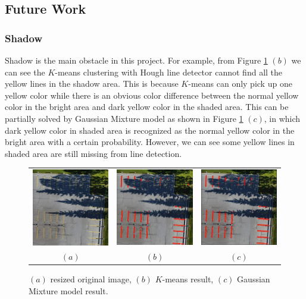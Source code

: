 \documentclass{m2pi}
\begin{document}
\subsection{Future Work}

\subsubsection{Shadow}


Shadow is the main obstacle in this project. For example, from Figure \ref{lot11result} $(b)$ we can see the $K$-means clustering with Hough line detector cannot find all the yellow lines in the shadow area. This is because $K$-means can only pick up one yellow color while there is an obvious color difference between the normal yellow color in the bright area and dark yellow color in the shaded area. This can be partially solved by Gaussian Mixture model as shown in Figure \ref{lot11result} $(c)$, in which dark yellow color in shaded area is recognized as the normal yellow color in the bright area with a certain probability. However, we can see some yellow lines in shaded area are still missing from line detection.

\begin{figure}[htp]
\centering
\begin{tabular}{ccc}
\includegraphics[width=3.8cm]{figures/Resized_Lot11.jpg}&
\includegraphics[width=3.8cm]{figures/Boxed_Lot11.jpg}&
\includegraphics[width=3.8cm]{figures/detected_Lot11.jpg}\\
$(a)$ & $(b)$ & $(c)$
\end{tabular}
\caption{$(a)$ resized original image, $(b)$ $K$-means result,
$(c)$ Gaussian Mixture model result.}
\label{lot11result}
\end{figure}
\end{document}
